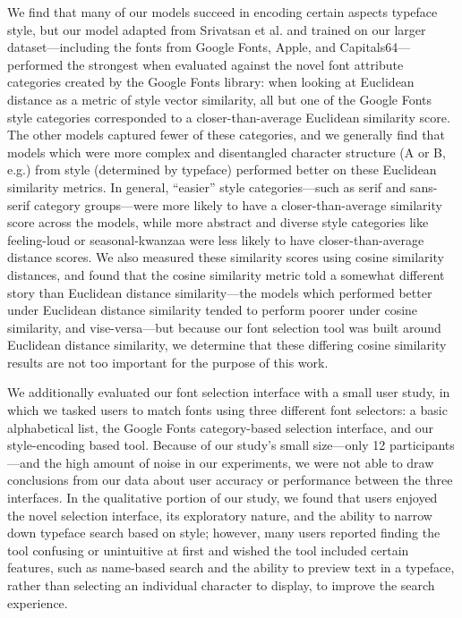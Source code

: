 We find that many of our models succeed in encoding certain aspects typeface style, but our model adapted from Srivatsan et al. \cite{srivatsan2020} and trained on our larger dataset---including the fonts from Google Fonts, Apple, and Capitals64---performed the strongest when evaluated against the novel font attribute categories created by the Google Fonts library: when looking at Euclidean distance as a metric of style vector similarity, all but one of the Google Fonts style categories corresponded to a closer-than-average Euclidean similarity score. The other models captured fewer of these categories, and we generally find that models which were more complex and disentangled character structure (A or B, e.g.) from style (determined by typeface) performed better on these Euclidean similarity metrics. In general, ``easier'' style categories---such as serif and sans-serif category groups---were more likely to have a closer-than-average similarity score across the models, while more abstract and diverse style categories like feeling-loud or seasonal-kwanzaa were less likely to have closer-than-average distance scores. We also measured these similarity scores using cosine similarity distances, and found that the cosine similarity metric told a somewhat different story than Euclidean distance similarity---the models which performed better under Euclidean distance similarity tended to perform poorer under cosine similarity, and vise-versa---but because our font selection tool was built around Euclidean distance similarity, we determine that these differing cosine similarity results are not too important for the purpose of this work.

We additionally evaluated our font selection interface with a small user study, in which we tasked users to match fonts using three different font selectors: a basic alphabetical list, the Google Fonts category-based selection interface, and our style-encoding based tool. Because of our study's small size---only 12 participants---and the high amount of noise in our experiments, we were not able to draw conclusions from our data about user accuracy or performance between the three interfaces. In the qualitative portion of our study, we found that users enjoyed the novel selection interface, its exploratory nature, and the ability to narrow down typeface search based on style; however, many users reported finding the tool confusing or unintuitive at first and wished the tool included certain features, such as name-based search and the ability to preview text in a typeface, rather than selecting an individual character to display, to improve the search experience.

